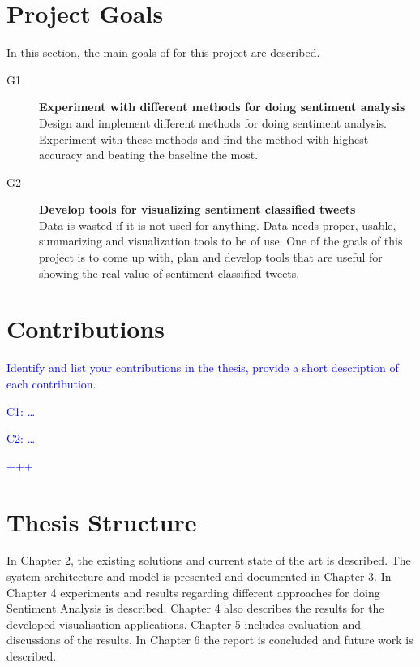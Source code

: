 \section{Project Goals}
\label{sec:projectgoals}

In this section, the main goals of for this project are described.

\begin{description}

\item[G1] \textbf{Experiment with different methods for doing sentiment analysis} \\
	Design and implement different methods for doing sentiment analysis. Experiment with these methods and find the method with highest accuracy and beating the baseline the most. 
	
\item[G2] \textbf{Develop tools for visualizing sentiment classified tweets} \\
    Data is wasted if it is not used for anything. Data needs proper, usable, summarizing and visualization tools to be of use. One of the goals of this project is to come up with, plan and develop tools that are useful for showing the real value of sentiment classified tweets. 

\end{description}

	

\section{Contributions}
\label{sec:contribution}
\textcolor{blue}{Identify and list your contributions in the thesis, provide a short description of each contribution.}

\textcolor{blue}{C1: \ldots}

\textcolor{blue}{C2: \ldots}

\textcolor{blue}{+++}


\section{Thesis Structure}
\label{sec:structure}

In Chapter 2, the existing solutions and current state of the art is described. The system architecture and model is presented and documented in Chapter 3. In Chapter 4 experiments and results regarding different approaches for doing Sentiment Analysis is described. Chapter 4 also describes the results for the developed visualisation applications. Chapter 5 includes evaluation and discussions of the results. In Chapter 6 the report is concluded and future work is described. 




